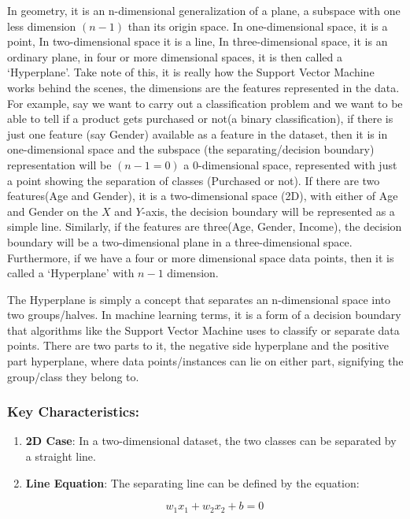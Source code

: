 \documentclass[11pt]{article}
\begin{document}
In geometry, it is an n-dimensional generalization of a plane, a
subspace with one less dimension $(n-1)$ than its origin space. In
one-dimensional space, it is a point, In two-dimensional space it is a
line, In three-dimensional space, it is an ordinary plane, in four or
more dimensional spaces, it is then called a `Hyperplane'. Take note of
this, it is really how the Support Vector Machine works behind the
scenes, the dimensions are the features represented in the data. For
example, say we want to carry out a classification problem and we want
to be able to tell if a product gets purchased or not(a binary
classification), if there is just one feature (say Gender) available as
a feature in the dataset, then it is in one-dimensional space and the
subspace (the separating/decision boundary) representation will be
$(n-1=0)$ a 0-dimensional space, represented with just a point showing
the separation of classes (Purchased or not). If there are two
features(Age and Gender), it is a two-dimensional space (2D), with
either of Age and Gender on the $X$ and $Y$-axis, the decision
boundary will be represented as a simple line. Similarly, if the
features are three(Age, Gender, Income), the decision boundary will be a
two-dimensional plane in a three-dimensional space. Furthermore, if we
have a four or more dimensional space data points, then it is called a
`Hyperplane' with $n-1$ dimension.

The Hyperplane is simply a concept that separates an n-dimensional space
into two groups/halves. In machine learning terms, it is a form of a
decision boundary that algorithms like the Support Vector Machine uses
to classify or separate data points. There are two parts to it, the
negative side hyperplane and the positive part hyperplane, where data
points/instances can lie on either part, signifying the group/class they
belong to.

    

    \subsubsection{Key Characteristics:}\label{key-characteristics}

\begin{enumerate}
\def\labelenumi{\arabic{enumi}.}
\item
  \textbf{2D Case}: In a two-dimensional dataset, the two classes can be
  separated by a straight line.
\item
  \textbf{Line Equation}: The separating line can be defined by the
  equation:

  $$
  w_1 x_1 + w_2 x_2 + b = 0
  $$
\end{enumerate}
\end{document}
